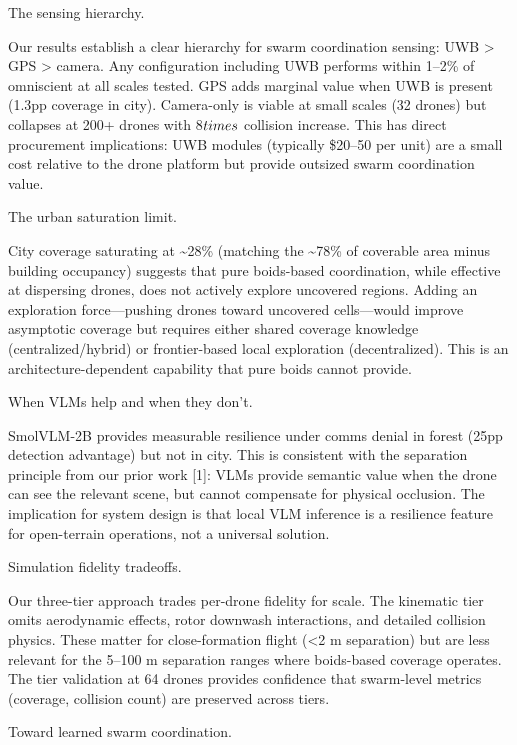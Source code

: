 \documentclass[conference]{IEEEtran}
\begin{document}
The sensing hierarchy.

Our results establish a clear hierarchy for swarm coordination sensing:
UWB \textgreater{} GPS \textgreater{} camera. Any configuration
including UWB performs within 1--2\% of omniscient at all scales tested.
GPS adds marginal value when UWB is present (1.3pp coverage in city).
Camera-only is viable at small scales (32 drones) but collapses at 200+
drones with 8$\\times$ collision increase. This has direct procurement
implications: UWB modules (typically \$20--50 per unit) are a small cost
relative to the drone platform but provide outsized swarm coordination
value.

The urban saturation limit.

City coverage saturating at \textasciitilde28\% (matching the
\textasciitilde78\% of coverable area minus building occupancy) suggests
that pure boids-based coordination, while effective at dispersing
drones, does not actively explore uncovered regions. Adding an
exploration force---pushing drones toward uncovered cells---would
improve asymptotic coverage but requires either shared coverage
knowledge (centralized/hybrid) or frontier-based local exploration
(decentralized). This is an architecture-dependent capability that pure
boids cannot provide.

When VLMs help and when they don't.

SmolVLM-2B provides measurable resilience under comms denial in forest
(25pp detection advantage) but not in city. This is consistent with the
separation principle from our prior work [1]: VLMs provide semantic
value when the drone can see the relevant scene, but cannot compensate
for physical occlusion. The implication for system design is that local
VLM inference is a resilience feature for open-terrain operations, not a
universal solution.

Simulation fidelity tradeoffs.

Our three-tier approach trades per-drone fidelity for scale. The
kinematic tier omits aerodynamic effects, rotor downwash interactions,
and detailed collision physics. These matter for close-formation flight
(\textless2 m separation) but are less relevant for the 5--100 m
separation ranges where boids-based coverage operates. The tier
validation at 64 drones provides confidence that swarm-level metrics
(coverage, collision count) are preserved across tiers.

Toward learned swarm coordination.
\end{document}
